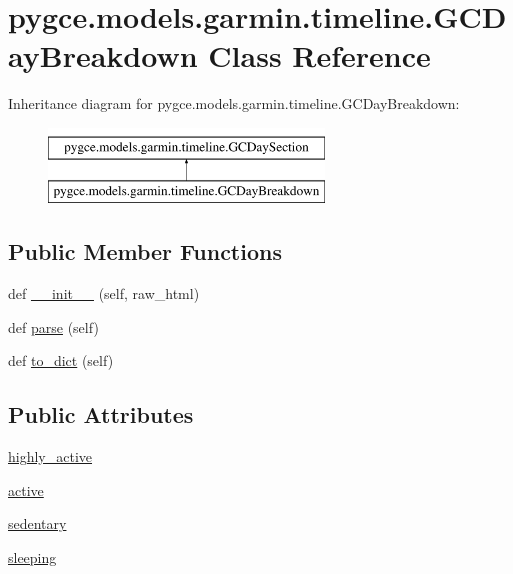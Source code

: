 \hypertarget{classpygce_1_1models_1_1garmin_1_1timeline_1_1_g_c_day_breakdown}{}\section{pygce.\+models.\+garmin.\+timeline.\+G\+C\+Day\+Breakdown Class Reference}
\label{classpygce_1_1models_1_1garmin_1_1timeline_1_1_g_c_day_breakdown}
Inheritance diagram for pygce.\+models.\+garmin.\+timeline.\+G\+C\+Day\+Breakdown\+:\begin{figure}[H]
\begin{center}
\leavevmode
\includegraphics[height=2.000000cm]{classpygce_1_1models_1_1garmin_1_1timeline_1_1_g_c_day_breakdown}
\end{center}
\end{figure}
\subsection*{Public Member Functions}
\begin{DoxyCompactItemize}
\item 
def \hyperlink{classpygce_1_1models_1_1garmin_1_1timeline_1_1_g_c_day_breakdown_af19f3c3dad89dff7f543be029b0778f7}{\+\_\+\+\_\+init\+\_\+\+\_\+} (self, raw\+\_\+html)
\item 
def \hyperlink{classpygce_1_1models_1_1garmin_1_1timeline_1_1_g_c_day_breakdown_aac05cc21c76e377ad50dcfcaca3a54da}{parse} (self)
\item 
def \hyperlink{classpygce_1_1models_1_1garmin_1_1timeline_1_1_g_c_day_breakdown_a517a2e5b269e95331fb51f531a5b9e4b}{to\+\_\+dict} (self)
\end{DoxyCompactItemize}
\subsection*{Public Attributes}
\begin{DoxyCompactItemize}
\item 
\hyperlink{classpygce_1_1models_1_1garmin_1_1timeline_1_1_g_c_day_breakdown_a736edad716e1770862ceac10f2d262e3}{highly\+\_\+active}
\item 
\hyperlink{classpygce_1_1models_1_1garmin_1_1timeline_1_1_g_c_day_breakdown_afabd12a8a6d22c156f9495483e4419b6}{active}
\item 
\hyperlink{classpygce_1_1models_1_1garmin_1_1timeline_1_1_g_c_day_breakdown_a03d898e7c3c8131ff30e0316d7257739}{sedentary}
\item 
\hyperlink{classpygce_1_1models_1_1garmin_1_1timeline_1_1_g_c_day_breakdown_a26a3f7d4d5903c8ad6221c11ded6d601}{sleeping}
\end{DoxyCompactItemize}


